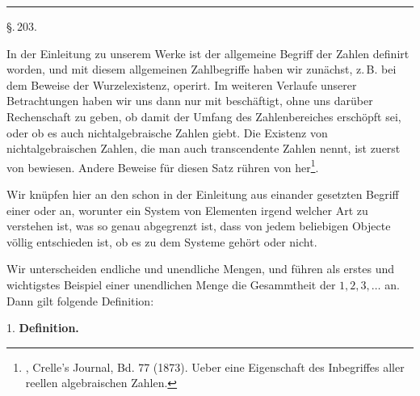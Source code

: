 
\begin{center}

\end{center}

\begin{center}
\rule{4cm}{0.4pt}
\end{center}

\begin{center}
\S.\,203.

\end{center}

In der Einleitung zu unserem Werke ist der allgemeine Begriff der Zahlen definirt worden, und mit diesem allgemeinen Zahlbegriffe haben wir zunächst, z.\,B. bei dem Beweise der Wurzelexistenz, operirt. Im weiteren Verlaufe unserer Betrachtungen haben wir uns dann nur mit  beschäftigt, ohne uns darüber Rechenschaft zu geben, ob damit der Umfang des Zahlenbereiches erschöpft sei, oder ob es auch nichtalgebraische Zahlen giebt. Die Existenz von nichtalgebraischen Zahlen, die man auch transcendente Zahlen nennt, ist zuerst von  bewiesen. Andere Beweise für diesen Satz rühren von  her\footnote{, Crelle's Journal, Bd. 77 (1873). Ueber eine Eigenschaft des Inbegriffes aller reellen algebraischen Zahlen.}.

Wir knüpfen hier an den schon in der Einleitung aus einander gesetzten Begriff einer  oder  an, worunter ein System von Elementen irgend welcher Art zu verstehen ist, was so genau abgegrenzt ist, dass von jedem beliebigen Objecte völlig entschieden ist, ob es zu dem Systeme gehört oder nicht.

Wir unterscheiden endliche und unendliche Mengen, und führen als erstes und wichtigstes Beispiel einer unendlichen Menge die Gesammtheit der  $1, 2, 3, \ldots$ an. Dann gilt folgende Definition:

1. \textbf{Definition.} 
